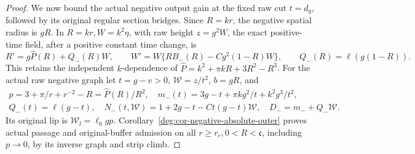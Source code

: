 \begin{proof}
We now bound the actual negative output gain at the fixed raw cut
\(t=d_q\), followed by its original regular section bridges.
Since \(R=kr\), the negative spatial radius is \(gR\).
In \(R=kr,W=k^2\eta\), with raw height \(z=g^2W\), the exact
positive-time field, after a positive constant time change, is
\[
 R'=g\widehat P(R)+Q_-(R)W,\qquad
 W'=W\{RB_-(R)-Cg^2(1-R)W\},\qquad
 Q_-(R)=\ell(g(1-R)).
\]
This retains the independent \(k\)-dependence of
\(\widehat P=k^2+\pi kR+3R^2-R^3\).
For the actual raw negative graph let \(t=g-v>0\),
\(\mathcal W=z/t^2\), \(b=gR\), and
\[
 \begin{gathered}
 p=3+\pi/r+r^{-2}-R=\widehat P(R)/R^2,\quad
 m_-(t)=3g-t+\pi kg^2/t+k^2g^3/t^2,\\
 Q_-(t)=\ell(g-t),\quad
 N_-(t,\mathcal W)=1+2g-t-Ct(g-t)\mathcal W,\quad
 D_-=m_-+Q_-\mathcal W.
 \end{gathered}
\]
Its original lip is \(\mathcal W_l=\ell_0gp\).
Corollary~\ref{deg:cor-negative-absolute-outer} proves actual passage
and original-buffer admission on all \(r\ge r_c,0<R<\mathfrak c\),
including \(p\to0\), by its inverse graph and strip climb.


\end{proof}
